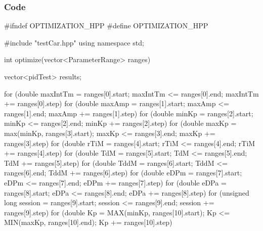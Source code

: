 \documentclass[a4paper,12pt]{report}
\begin{document}
\subsubsection{Code}
\begin{lstlising}[language=C++]
#ifndef OPTIMIZATION_HPP
#define OPTIMIZATION_HPP

#include "testCar.hpp"
using namespace std;

int optimize(vector<ParameterRange> ranges)
{
    vector<pidTest> results;

        for (double maxIntTm = ranges[0].start; maxIntTm <= ranges[0].end; maxIntTm += ranges[0].step)
        {
                for (double maxAmp = ranges[1].start; maxAmp <= ranges[1].end; maxAmp += ranges[1].step)
                {
                        for (double minKp = ranges[2].start; minKp <= ranges[2].end; minKp += ranges[2].step)
                        {
                                for (double maxKp = max(minKp, ranges[3].start);
                                         maxKp <= ranges[3].end; maxKp += ranges[3].step)
                                {
                                        for (double rTiM = ranges[4].start; rTiM <= ranges[4].end; rTiM += ranges[4].step)
                                        {
                                                for (double TdM = ranges[5].start; TdM <= ranges[5].end; TdM += ranges[5].step)
                                                {
                                                        for (double TddM = ranges[6].start; TddM <= ranges[6].end; TddM += ranges[6].step)
                                                        {
                                                                for (double eDPm = ranges[7].start; eDPm <= ranges[7].end; eDPm += ranges[7].step)
                                                                {
                                                                        for (double eDPa = ranges[8].start; eDPa <= ranges[8].end; eDPa += ranges[8].step)
                                                                        {
                                                                                for (unsigned long session = ranges[9].start; session <= ranges[9].end; session += ranges[9].step)
                                                                                {
                                                                                        for (double Kp = MAX(minKp, ranges[10].start);
                                                                                                 Kp <= MIN(maxKp, ranges[10].end); Kp += ranges[10].step)
}}}}}}}}}}}
\end{lstlising}
\end{document}
